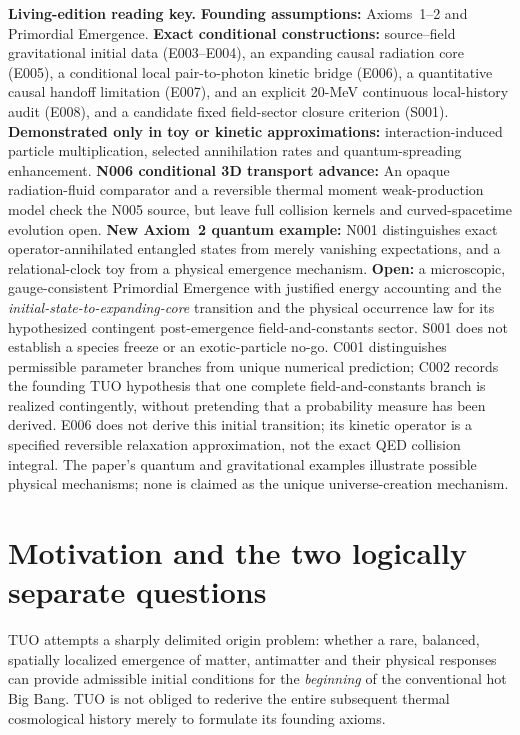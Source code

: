 \documentclass[11pt,a4paper]{article}
\theoremstyle{tmon}
\theoremstyle{definition}
\begin{document}
\begin{keybox}
\textbf{Living-edition reading key.} \textbf{Founding assumptions:} Axioms~1--2 and Primordial Emergence. \textbf{Exact conditional constructions:} source--field gravitational initial data (E003--E004), an expanding causal radiation core (E005), a conditional local pair-to-photon kinetic bridge (E006), a quantitative causal handoff limitation (E007), and an explicit 20-MeV continuous local-history audit (E008), and a candidate fixed field-sector closure criterion (S001). \textbf{Demonstrated only in toy or kinetic approximations:} interaction-induced particle multiplication, selected annihilation rates and quantum-spreading enhancement. \textbf{N006 conditional 3D transport advance:} An opaque radiation-fluid comparator and a reversible thermal moment weak-production model check the N005 source, but leave full collision kernels and curved-spacetime evolution open. \textbf{New Axiom~2 quantum example:} N001 distinguishes exact operator-annihilated entangled states from merely vanishing expectations, and a relational-clock toy from a physical emergence mechanism. \textbf{Open:} a microscopic, gauge-consistent Primordial Emergence with justified energy accounting and the \emph{initial-state-to-expanding-core} transition and the physical occurrence law for its hypothesized contingent post-emergence field-and-constants sector. S001 does not establish a species freeze or an exotic-particle no-go. C001 distinguishes permissible parameter branches from unique numerical prediction; C002 records the founding TUO hypothesis that one complete field-and-constants branch is realized contingently, without pretending that a probability measure has been derived. E006 does not derive this initial transition; its kinetic operator is a specified reversible relaxation approximation, not the exact QED collision integral. The paper's quantum and gravitational examples illustrate possible physical mechanisms; none is claimed as the unique universe-creation mechanism.
\end{keybox}

\tableofcontents
\clearpage

\section{Motivation and the two logically separate questions}
TUO attempts a sharply delimited origin problem: whether a rare, balanced, spatially localized emergence of matter, antimatter and their physical responses can provide admissible initial conditions for the \emph{beginning} of the conventional hot Big Bang. TUO is not obliged to rederive the entire subsequent thermal cosmological history merely to formulate its founding axioms.
\end{document}

